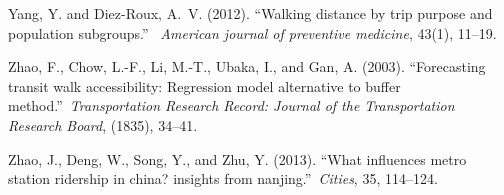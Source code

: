 \documentclass[sustainability,article,submit,moreauthors,pdftex,10pt,a4paper]{Definitions/mdpi}
\begin{document}
\begin{thebibliography}{999}
	Yang, Y. and Diez-Roux, A.~V. (2012).
	\newblock ``Walking distance by trip purpose and population subgroups.''\ {\em
		American journal of preventive medicine}, 43(1), 11--19.
	
	Zhao, F., Chow, L.-F., Li, M.-T., Ubaka, I., and Gan, A. (2003).
	\newblock ``Forecasting transit walk accessibility: Regression model
	alternative to buffer method.''\ {\em Transportation Research Record: Journal
		of the Transportation Research Board}, (1835), 34--41.
	
	Zhao, J., Deng, W., Song, Y., and Zhu, Y. (2013).
	\newblock ``What influences metro station ridership in china? insights from
	nanjing.''\ {\em Cities}, 35, 114--124.
	
\end{thebibliography}



%

\sampleavailability{}


\end{document}
